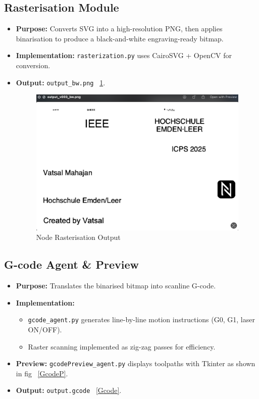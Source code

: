 \subsection{Rasterisation Module}
\begin{itemize}
	\item \textbf{Purpose:} Converts SVG into a high-resolution PNG, then applies binarisation to produce a black-and-white engraving-ready bitmap.
	\item \textbf{Implementation:} \texttt{rasterization.py} uses CairoSVG + OpenCV for conversion.
	\item \textbf{Output:} \texttt{output\_bw.png} ~\ref{raster}.
	
		\begin{figure}
		\begin{center}
			\includegraphics[width=0.5\linewidth]{Images/raster1.png}
			\caption{Node Rasterisation Output}
			\label{raster} 
		\end{center}
	\end{figure}
\end{itemize}



\subsection{G-code Agent \& Preview}
\begin{itemize}
	\item \textbf{Purpose:} Translates the binarised bitmap into scanline G-code.
	\item \textbf{Implementation:}
	\begin{itemize}
		\item \texttt{gcode\_agent.py} generates line-by-line motion instructions (G0, G1, laser ON/OFF).
		\item Raster scanning implemented as zig-zag passes for efficiency.
	\end{itemize}
	\item \textbf{Preview:} \texttt{gcodePreview\_agent.py} displays toolpaths with Tkinter as shown in fig ~\ref{GcodeP}.
	\item \textbf{Output:} \texttt{output.gcode} ~\ref{Gcode}.

		
\end{itemize}


